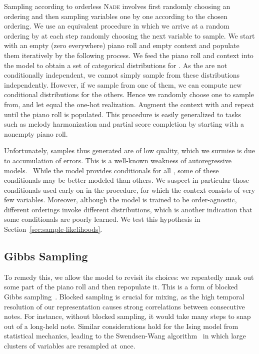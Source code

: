 \documentclass{article}
\newcommand{\nade}{\textsc{Nade}\xspace}
\begin{document}
Sampling according to orderless \nade involves first randomly choosing an ordering and then sampling variables one by one according to the chosen ordering.
We use an equivalent procedure in which we arrive at a random ordering by at each step randomly choosing the next variable to sample.
We start with an empty (zero everywhere) piano roll 
and empty context  and populate them iteratively by the following process.
We feed the piano roll  and context  into the model to obtain a set of categorical distributions  for .
As the  are not conditionally independent, we cannot simply sample from these distributions independently.
However, if we sample from one of them, we can compute new conditional distributions for the others.
Hence we randomly choose one  to sample from, and let  equal the one-hot realization.
Augment the context with  and repeat until the piano roll is populated.
This procedure is easily generalized to tasks such as melody harmonization and partial score completion by starting with a nonempty piano roll.

Unfortunately, samples thus generated are of low quality,
which we surmise is due to accumulation of errors.
This is a well-known weakness of autoregressive models.~\cite{venkatraman2015improving,bengio2015scheduled,huszar2015not,lamb2016professor}
While the model provides conditionals 
for all , some of these conditionals may be better modeled than others.
We suspect in particular those conditionals used early on in the procedure,
for which the context  consists of very few variables.
Moreover, although the model is trained to be order-agnostic,
different orderings invoke different distributions,
which is another indication that some conditionals are poorly learned.
We test this hypothesis in Section~\ref{sec:sample-likelihoods}.

\subsection{Gibbs Sampling} \label{sec:sampling-gibbs}

To remedy this, we allow the model to revisit its choices:
we repeatedly mask out some part of the piano roll and then repopulate it.
This is a form of blocked Gibbs sampling~\cite{liu1994collapsed}.
Blocked sampling is crucial for mixing, as the high temporal resolution
of our representation causes strong correlations between consecutive notes.
For instance, without blocked sampling, it would take many steps to snap out of a long-held note.
Similar considerations hold for the Ising model from statistical mechanics,
leading to the Swendsen-Wang algorithm~\cite{swendsen1987nonuniversal}
in which large clusters of variables are resampled at once.
\end{document}
